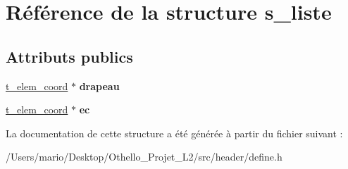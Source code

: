 \hypertarget{structs__liste}{}\section{Référence de la structure s\+\_\+liste}
\label{structs__liste}
\subsection*{Attributs publics}
\begin{DoxyCompactItemize}
\item 
\mbox{\label{structs__liste_a6d53d6af4e91f59c2ef2ecf710eca714}} 
\mbox{\hyperlink{structs__elem__coord}{t\+\_\+elem\+\_\+coord}} $\ast$ {\bfseries drapeau}
\item 
\mbox{\label{structs__liste_aa0761b409abe3f0e7e38257a24886d2a}} 
\mbox{\hyperlink{structs__elem__coord}{t\+\_\+elem\+\_\+coord}} $\ast$ {\bfseries ec}
\end{DoxyCompactItemize}


La documentation de cette structure a été générée à partir du fichier suivant \+:\begin{DoxyCompactItemize}
\item 
/\+Users/mario/\+Desktop/\+Othello\+\_\+\+Projet\+\_\+\+L2/src/header/define.\+h\end{DoxyCompactItemize}
